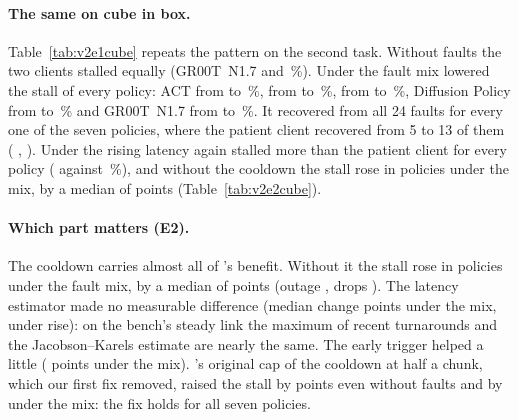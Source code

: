 \paragraph{The same on cube in box.} Table~\ref{tab:v2e1cube} repeats the pattern on the second task. Without faults
the two clients stalled equally (GR00T~N1.7  and
\,\%). Under the fault mix \drtc{} lowered the stall of every policy: ACT from
 to \,\%, \smolvla{} from
 to \,\%, \pizerofive{} from
 to \,\%, Diffusion Policy from
 to \,\% and GR00T~N1.7 from
 to \,\%. It recovered from all 24 faults
for every one of the seven policies, where the patient client recovered from 5 to 13 of them (\smolvla{}
, \pizerofive{} ). Under the rising
latency \drtc{} again stalled more than the patient client for every policy (\smolvla{}
 against \,\%), and without the cooldown
the stall rose in  policies under the mix, by a median of
 points (Table~\ref{tab:v2e2cube}).

\paragraph{Which part matters (E2).} The cooldown carries almost all of \drtc's benefit. Without it the stall rose in
 policies under the fault mix, by a median of  points (outage
, drops ). The latency estimator made no measurable
difference (median change  points under the mix, 
under rise): on the bench's steady link the maximum of recent turnarounds and the Jacobson--Karels estimate are nearly
the same. The early trigger helped a little ( points under the mix). \drtc's original
cap of the cooldown at half a chunk, which our first fix removed, raised the stall by 
points even without faults and by  under the mix: the fix holds for all seven policies.

